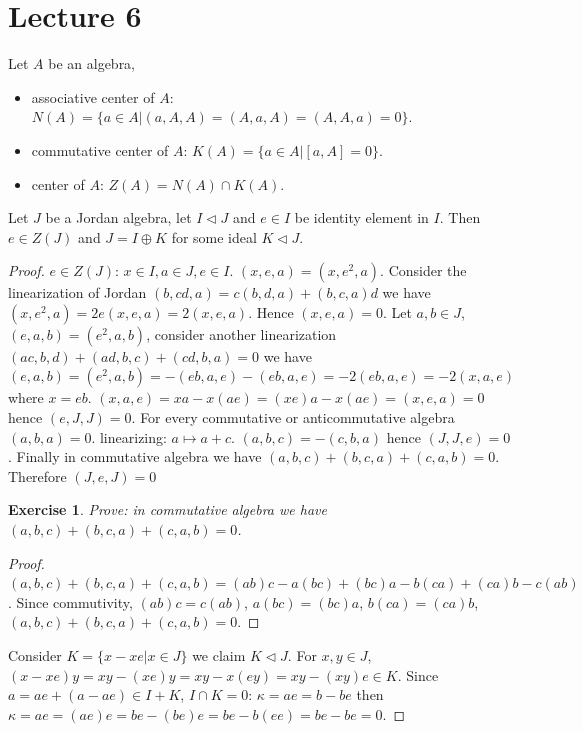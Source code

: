 \documentclass{article}
\newtheorem{exercise}[theorem]{Exercise}
\begin{document}
\section{Lecture 6}

\begin{definition} 
Let $ A $ be an algebra,
\begin{itemize}
\item associative center of $ A $: $ N(A) =\{ a \in A | (a,A,A)=(A,a,A)=(A,A,a)=0  \}$.
\item commutative center of $ A $: $ K(A)=\{ a \in A | [a,A]=0  \}$.
\item center of $ A $: $ Z(A)=N(A) \cap K(A) $.
\end{itemize}
\end{definition}

\begin{lemma} 
Let $ J $ be a Jordan algebra, let $ I \triangleleft J $ and $ e \in I $ be identity element in $ I $. Then $ e \in Z(J) $ and $ J =I \oplus K $ for some ideal $ K \triangleleft J $.
\end{lemma}

\begin{proof} 
$ e \in Z(J) $: $ x \in I, a \in J, e \in I $. $ (x,e,a)=(x,e^2,a) $. Consider the linearization of Jordan $ (b,cd,a)=c(b,d,a)+(b,c,a)d $ we have $ (x,e^2,a)=2e(x,e,a)=2(x,e,a)$. Hence $ (x,e,a)=0 $. Let $ a,b \in J $, $ (e,a,b)=(e^2,a,b) $, consider another linearization $ (ac,b,d)+(ad,b,c)+(cd,b,a)=0 $ we have $ (e,a,b)=(e^2,a,b)=-(eb,a,e)-(eb,a,e)=-2(eb,a,e) =-2(x,a,e)$ where $ x=eb $. $ (x,a,e)=xa-x(ae)=(xe)a-x(ae)=(x,e,a)=0  $ hence $ (e,J,J)=0 $. For every commutative or anticommutative algebra $ (a,b,a)=0 $. linearizing: $ a \mapsto a+c $. $ (a,b,c)=-(c,b,a) $ hence $ (J,J,e)=0 $. Finally in commutative algebra we have $ (a,b,c)+(b,c,a)+(c,a,b)=0 $. Therefore $ (J,e,J)=0 $ 
\begin{exercise}
Prove: in commutative algebra we have $ (a,b,c)+(b,c,a)+(c,a,b)=0 $.
\end{exercise}

\begin{proof} 
$ (a,b,c)+(b,c,a)+(c,a,b)=(ab)c-a(bc)+(bc)a-b(ca)+(ca)b -c(ab)$. Since commutivity, $ (ab)c=c(ab) $, $ a(bc)=(bc)a $, $ b(ca)=(ca)b $, $ (a,b,c)+(b,c,a)+(c,a,b)=0 $.     
\end{proof}

Consider $ K=\{x-xe | x\in J  \} $ we claim $ K \triangleleft J $. For $ x,y \in J $, $ (x-xe)y=xy-(xe)y=xy-x(ey)=xy-(xy)e \in K $. Since $ a=ae+(a-ae) \in I + K$, $ I \cap K=0 $: $ \kappa=ae=b-be $ then $ \kappa =ae=(ae)e =be-(be)e=be-b(ee)=be-be=0$.       
\end{proof}
\end{document}
